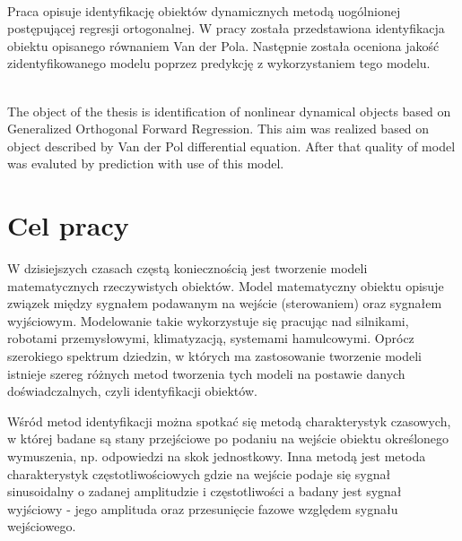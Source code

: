 



\renewcommand{\tablename}{Tabela}

\pagestyle{empty}
\stronatytulowa

\newpage
\setcounter{page}{1}

\newpage
\textbf{\tytulpl} \vspace*{0.2cm} \\
Praca opisuje identyfikację obiektów dynamicznych metodą uogólnionej postępującej regresji ortogonalnej. W pracy została przedstawiona identyfikacja obiektu opisanego równaniem Van der Pola. Następnie została oceniona jakość zidentyfikowanego modelu poprzez predykcję z wykorzystaniem tego modelu.

\vspace*{2cm}
\textbf{\tytulen} \vspace*{0.2cm} \\
The object of the thesis is identification of nonlinear dynamical objects based on Generalized Orthogonal Forward Regression. This aim was realized based on object described by Van der Pol differential equation. After that quality of model was evaluted by prediction with use of this model. 

\newpage
\tableofcontents

\newpage
\pagestyle{plain}

\section{Cel pracy}
	W dzisiejszych czasach częstą koniecznością jest tworzenie modeli matematycznych rzeczywistych obiektów. Model matematyczny obiektu opisuje związek między sygnałem podawanym na wejście (sterowaniem) oraz sygnałem wyjściowym. Modelowanie takie wykorzystuje się pracując nad silnikami, robotami przemysłowymi, klimatyzacją, systemami hamulcowymi\cite{Isermann}. Oprócz szerokiego spektrum dziedzin, w których ma zastosowanie tworzenie modeli istnieje szereg różnych metod tworzenia tych modeli na postawie danych doświadczalnych, czyli identyfikacji obiektów.
	
	Wśród metod identyfikacji można spotkać się metodą charakterystyk czasowych, w której badane są stany przejściowe po podaniu na wejście obiektu określonego wymuszenia, np. odpowiedzi na skok jednostkowy. Inna metodą jest metoda charakterystyk częstotliwościowych gdzie na wejście podaje się sygnał sinusoidalny o zadanej amplitudzie i częstotliwości a badany jest sygnał wyjściowy - jego amplituda oraz przesunięcie fazowe względem sygnału wejściowego\cite{Czemplik}.
	
